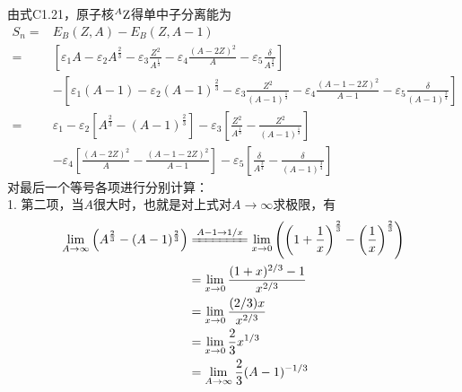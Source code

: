 \vspace{3mm}
\begin{exercise*}[C.2]
    由式C1.21，原子核$^{A}{\rm Z}$得单中子分离能为
    \begin{equation*}
        \begin{aligned}
            S_n =& E_B(Z, A) - E_B(Z, A - 1)    \\
                =& \left[ \varepsilon_1 A - \varepsilon_2 A^{\frac{2}{3}}
                  - \varepsilon_3 \frac{Z^2}{A^{\frac{1}{3}}} 
                  - \varepsilon_4 \frac{(A - 2Z)^2}{A}
                  - \varepsilon_5 \frac{\delta}{A^{\frac{3}{4}}}\right] \\
                  &-
                  \left[ \varepsilon_1 (A - 1) - \varepsilon_2 (A - 1)^{\frac{2}{3}}
                  - \varepsilon_3 \frac{Z^2}{(A - 1)^{\frac{1}{3}}} 
                  - \varepsilon_4 \frac{(A - 1 - 2Z)^2}{A - 1}
                  - \varepsilon_5 \frac{\delta}{{(A - 1)}^{\frac{3}{4}}}\right] \\
                =& \varepsilon_1 - \varepsilon_2\left[A^{\frac{2}{3}} - (A - 1)^{\frac{2}{3}}\right]
                  -\varepsilon_3\left[\frac{Z^2}{A^{\frac{1}{3}}} - \frac{Z^2}{(A - 1)^{\frac{1}{3}}}\right] \\
                 & -\varepsilon_4\left[\frac{(A - 2Z)^2}{A} - \frac{(A - 1 - 2Z)^2}{A - 1} \right]
                  -\varepsilon_5\left[\frac{\delta}{A^{\frac{3}{4}}} - \frac{\delta}{{(A - 1)}^{\frac{3}{4}}}\right]
        \end{aligned}
    \end{equation*}
    对最后一个等号各项进行分别计算：\\
    1. 第二项，当$A$很大时，也就是对上式对$A\rightarrow \infty$求极限，有
    \begin{equation}
        \begin{aligned}
            \lim_{A \to \infty} \left(A^{\frac{2}{3}} - (A - 1)^{\frac{2}{3}} \right)
            &\xlongequal[]{A - 1 \to 1/x} \lim_{x \to 0} \left(\left(1 + \frac{1}{x}\right)^{\frac{2}{3}}
            - \left(\frac{1}{x}\right)^{\frac{2}{3}} \right) \\
            &= \lim_{x \to 0} \frac{(1 + x)^{2/3} - 1}{x^{2/3}} \\
            &= \lim_{x \to 0} \frac{(2/3) x}{x^{2/3}} \\
            &= \lim_{x \to 0} \frac{2}{3} x^{1/3}     \\
            &= \lim_{A \to \infty} \frac{2}{3} (A - 1)^{-1/3}
        \end{aligned}

\end{equation}
\end{exercise*}
